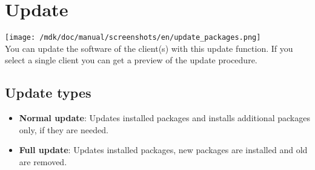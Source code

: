 \section{Update}
\texttt{[image: /mdk/doc/manual/screenshots/en/update\_packages.png]} \\
You can update the software of the client(s) with this update function. If you select a single client you can get a preview of the update procedure.\\
\subsection{Update types}
\begin{itemize}
\item \textbf{Normal update}: Updates installed packages and installs additional packages only, if they are needed.\\
\item \textbf{Full update}: Updates installed packages, new packages are installed and old are removed.\\
\end{itemize}
